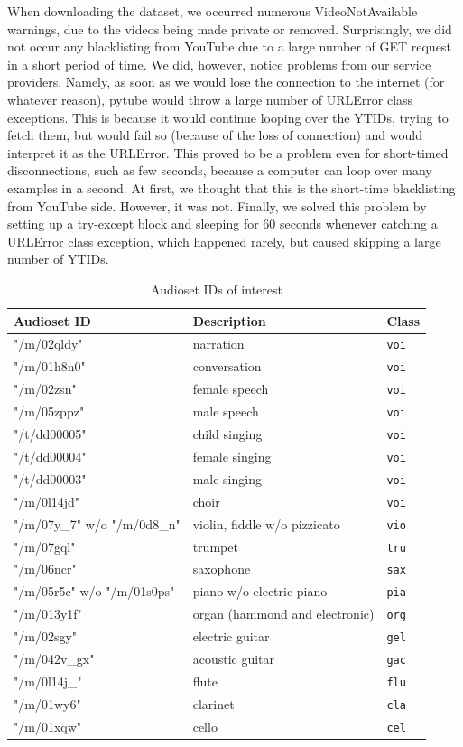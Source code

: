 When downloading the dataset, we occurred numerous VideoNotAvailable warnings, due to the videos being made private or removed. Surprisingly, we did not occur any blacklisting from YouTube due to a large number of GET request in a short period of time. We did, however, notice problems from our service providers. Namely, as soon as we would lose the connection to the internet (for whatever reason), pytube would throw a large number of URLError class exceptions. This is because it would continue looping over the YTIDs, trying to fetch them, but would fail so (because of the loss of connection) and would interpret it as the URLError. This proved to be a problem even for short-timed disconnections, such as few seconds, because a computer can loop over many examples in a second. At first, we thought that this is the short-time blacklisting from YouTube side. However, it was not. Finally, we solved this problem by setting up a try-except block and sleeping for 60 seconds whenever catching a URLError class exception, which happened rarely, but caused skipping a large number of YTIDs.

\begin{table}[H]
\centering
\begin{tabular}{l l l}
\hline
Audioset ID & Description & Class \\ \hline
"/m/02qldy" & narration & \texttt{voi} \\
"/m/01h8n0" & conversation & \texttt{voi} \\
"/m/02zsn" & female speech & \texttt{voi} \\
"/m/05zppz" & male speech & \texttt{voi} \\
"/t/dd00005" & child singing & \texttt{voi} \\
"/t/dd00004" & female singing & \texttt{voi} \\
"/t/dd00003" & male singing & \texttt{voi} \\
"/m/0l14jd" & choir & \texttt{voi} \\
"/m/07y\_7" w/o "/m/0d8\_n" & violin, fiddle w/o pizzicato & \texttt{vio} \\
"/m/07gql" & trumpet & \texttt{tru} \\
"/m/06ncr" & saxophone & \texttt{sax} \\
"/m/05r5c" w/o "/m/01s0ps" & piano w/o electric piano & \texttt{pia} \\
"/m/013y1f" & organ (hammond and electronic) & \texttt{org} \\
"/m/02sgy" & electric guitar & \texttt{gel} \\
"/m/042v\_gx" & acoustic guitar & \texttt{gac} \\
"/m/0l14j\_" & flute & \texttt{flu} \\
"/m/01wy6" & clarinet & \texttt{cla} \\
"/m/01xqw" & cello & \texttt{cel}
\end{tabular}
\caption{Audioset IDs of interest}
\label{tab:audioset-ids}
\end{table}

